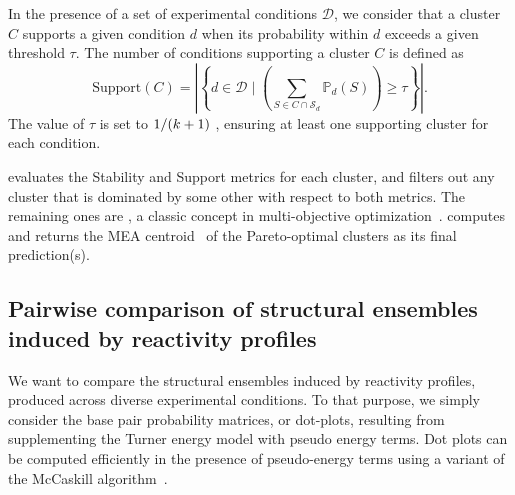 \documentclass[a4,center,fleqn]{NAR}
\begin{document}
 In the presence of a set of experimental conditions $\mathcal{D}$, we consider that a cluster $C$ supports a given condition $d$ when its probability within $d$ exceeds a given threshold $\tau$. The number of conditions supporting a cluster $C$ is defined as
$$\text{Support}(C) = \left|\left\{d\in \mathcal{D} \mid \left(\textstyle\sum_{S\in C\cap \mathcal{S}_d} \mathbb{P}_d(S)\right)\ge \tau \right\}\right|.$$
The value of $\tau$ is set to $1/(k+1)$ ,  ensuring at least one supporting cluster for each condition.

\OurTool evaluates the Stability and Support metrics for each cluster, and filters out any cluster that is dominated by some other with respect to both metrics. The remaining ones are , a classic concept in multi-objective optimization~\cite{Mattson2005}. \OurTool computes and returns the MEA centroid~\cite{Lu2009} of the Pareto-optimal clusters as its final prediction(s).



\subsection*{Pairwise comparison of structural ensembles induced by reactivity profiles}\label{sec:dotplots}

We want to compare the structural ensembles induced by reactivity profiles, produced across diverse experimental conditions. To that purpose, we simply consider the base pair probability matrices, or dot-plots, resulting from supplementing the Turner energy model with pseudo energy terms. %
Dot plots can be computed efficiently in the presence of pseudo-energy terms using a variant of the McCaskill algorithm~\citep{McCaskill1990}.

\end{document}
